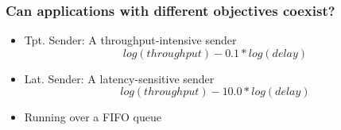 \begin{frame}[noframenumbering]
\frametitle{Can applications with different objectives coexist?}
\begin{itemize}
\item Tpt. Sender: A throughput-intensive sender
\begin{equation}
log(throughput) - 0.1 * log(delay)
\end{equation}
\item Lat. Sender: A latency-sensitive sender
\begin{equation}
log(throughput) - 10.0 * log(delay)
\end{equation}
\item Running over a FIFO queue
\end{itemize}
\end{frame}

